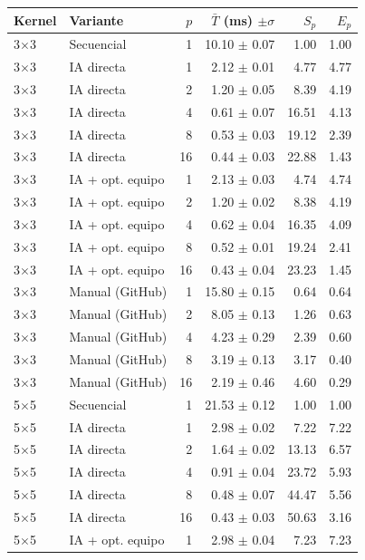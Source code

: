 \begin{tabular}{llrrrr}
\toprule
Kernel & Variante & $p$ & $\bar{T}$ (ms) $\pm\sigma$ & $S_p$ & $E_p$ \\
\midrule
3$\times$3 & Secuencial & 1 & 10.10 $\pm$ 0.07 & 1.00 & 1.00 \\
3$\times$3 & IA directa & 1 & 2.12 $\pm$ 0.01 & 4.77 & 4.77 \\
3$\times$3 & IA directa & 2 & 1.20 $\pm$ 0.05 & 8.39 & 4.19 \\
3$\times$3 & IA directa & 4 & 0.61 $\pm$ 0.07 & 16.51 & 4.13 \\
3$\times$3 & IA directa & 8 & 0.53 $\pm$ 0.03 & 19.12 & 2.39 \\
3$\times$3 & IA directa & 16 & 0.44 $\pm$ 0.03 & 22.88 & 1.43 \\
3$\times$3 & IA + opt. equipo & 1 & 2.13 $\pm$ 0.03 & 4.74 & 4.74 \\
3$\times$3 & IA + opt. equipo & 2 & 1.20 $\pm$ 0.02 & 8.38 & 4.19 \\
3$\times$3 & IA + opt. equipo & 4 & 0.62 $\pm$ 0.04 & 16.35 & 4.09 \\
3$\times$3 & IA + opt. equipo & 8 & 0.52 $\pm$ 0.01 & 19.24 & 2.41 \\
3$\times$3 & IA + opt. equipo & 16 & 0.43 $\pm$ 0.04 & 23.23 & 1.45 \\
3$\times$3 & Manual (GitHub) & 1 & 15.80 $\pm$ 0.15 & 0.64 & 0.64 \\
3$\times$3 & Manual (GitHub) & 2 & 8.05 $\pm$ 0.13 & 1.26 & 0.63 \\
3$\times$3 & Manual (GitHub) & 4 & 4.23 $\pm$ 0.29 & 2.39 & 0.60 \\
3$\times$3 & Manual (GitHub) & 8 & 3.19 $\pm$ 0.13 & 3.17 & 0.40 \\
3$\times$3 & Manual (GitHub) & 16 & 2.19 $\pm$ 0.46 & 4.60 & 0.29 \\
\midrule
5$\times$5 & Secuencial & 1 & 21.53 $\pm$ 0.12 & 1.00 & 1.00 \\
5$\times$5 & IA directa & 1 & 2.98 $\pm$ 0.02 & 7.22 & 7.22 \\
5$\times$5 & IA directa & 2 & 1.64 $\pm$ 0.02 & 13.13 & 6.57 \\
5$\times$5 & IA directa & 4 & 0.91 $\pm$ 0.04 & 23.72 & 5.93 \\
5$\times$5 & IA directa & 8 & 0.48 $\pm$ 0.07 & 44.47 & 5.56 \\
5$\times$5 & IA directa & 16 & 0.43 $\pm$ 0.03 & 50.63 & 3.16 \\
5$\times$5 & IA + opt. equipo & 1 & 2.98 $\pm$ 0.04 & 7.23 & 7.23 \\

\end{tabular}
